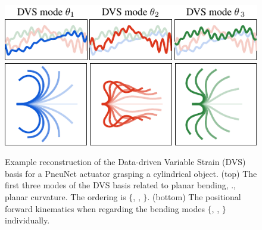 \begin{figure}[!t]
\centering
\includegraphics*[width=.8\textwidth]{./pdf/thesis-figure-6-11-2.pdf}  \\[0.15em]
\includegraphics*[width=.8\textwidth]{./pdf/thesis-figure-6-11-3.pdf}%
% 
\caption{Example reconstruction of the Data-driven Variable Strain (DVS) basis for a PneuNet actuator grasping a cylindrical object. (top) The first three modes of the DVS basis related to planar bending, \ie., planar curvature. The ordering is $\{$, , $\}$. (bottom) The positional forward kinematics when regarding the bending modes $\{$, , $\}$ individually.}
\label{fig:C5:gvis_modes}
\end{figure}
%

